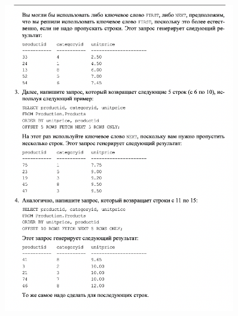 \begin{figure}[h!]
	\begin{center}
		\includegraphics[width=0.9\textwidth]{img/ex5.png}
	\end{center}
	\captionsetup{justification=centering}
\end{figure}
\clearpage



